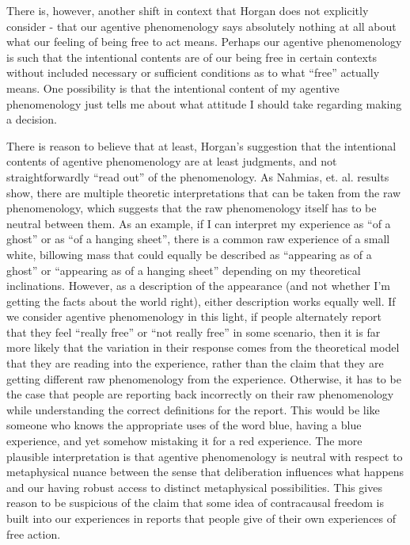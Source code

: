 \documentclass[phd,12pt,oneside,paper=letterpaper]{ubcthesis}
\begin{document}
There is, however, another shift in context that Horgan does not explicitly consider - that our agentive phenomenology says absolutely nothing at all about what our feeling of being free to act means. Perhaps our agentive phenomenology is such that the intentional contents are of our being free in certain contexts without included necessary or sufficient conditions as to what ``free'' actually means. One possibility is that the intentional content of my agentive phenomenology just tells me about what attitude I should take regarding making a decision. 

There is reason to believe that at least, Horgan's suggestion that the intentional contents of agentive phenomenology are at least judgments, and not straightforwardly ``read out'' of the phenomenology. As Nahmias, et. al. results show, there are multiple theoretic interpretations that can be taken from the raw phenomenology, which suggests that the raw phenomenology itself has to be neutral between them. As an example, if I can interpret my experience as ``of a ghost'' or as ``of a hanging sheet'', there is a common raw experience of a small white, billowing mass that could equally be described as ``appearing as of a ghost'' or ``appearing as of a hanging sheet'' depending on my theoretical inclinations. However, as a description of the appearance (and not whether I'm getting the facts about the world right), either description works equally well. If we consider agentive phenomenology in this light, if people alternately report that they feel ``really free'' or ``not really free'' in some scenario, then it is far more likely that the variation in their response comes from the theoretical model that they are reading into the experience, rather than the claim that they are getting different raw phenomenology from the experience. Otherwise, it has to be the case that people are reporting back incorrectly on their raw phenomenology while understanding the correct definitions for the report. This would be like someone who knows the appropriate uses of the word blue, having a blue experience, and yet somehow mistaking it for a red experience. The more plausible interpretation is that agentive phenomenology is neutral with respect to metaphysical nuance between the sense that deliberation influences what happens and our having robust access to distinct metaphysical possibilities. This gives reason to be suspicious of the claim that some idea of contracausal freedom is built into our experiences in reports that people give of their own experiences of free action. 
\end{document}
